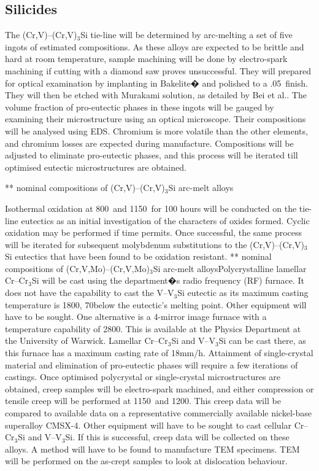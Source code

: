 \subsection{Silicides}

The (Cr,V)--(Cr,V)$_3$Si tie-line will be determined by arc-melting a set of five ingots of estimated compositions. As these alloys are expected to be brittle and hard at room temperature, sample machining will be done by electro-spark machining if cutting with a diamond saw proves unsuccessful. They will prepared for optical examination by implanting in Bakelite� and polished to a .05\micro\meter\ finish. They will then be etched with Murakami solution, as detailed by Bei et al.. The volume fraction of pro-eutectic phases in these ingots will be gauged by examining their microstructure using an optical microscope. Their compositions will be analysed using EDS. Chromium is more volatile than the other elements, and chromium losses are expected during manufacture. Compositions will be adjusted to eliminate pro-eutectic phases, and this process will be iterated till optimised eutectic microstructures are obtained. 

** nominal compositions of (Cr,V)--(Cr,V)$_3$Si arc-melt alloys

Isothermal oxidation at 800\celsius\ and 1150\celsius\ for 100 hours will be conducted on the tie-line eutectics as an initial investigation of the characters of oxides formed. Cyclic oxidation may be performed if time permits. Once successful, the same process will be iterated for subsequent molybdenum substitutions to the (Cr,V)--(Cr,V)$_3$Si eutectics that have been found to be oxidation resistant. 
** nominal compositions of (Cr,V,Mo)--(Cr,V,Mo)$_3$Si arc-melt alloysPolycrystalline lamellar Cr--Cr$_3$Si will be cast using the department�s radio frequency (RF) furnace. It does not have the capability to cast the V--V$_3$Si eutectic as its maximum casting temperature is 1800\celsius, 70\celsius below the eutectic's melting point. Other equipment will have to be sought. One alternative is a 4-mirror image furnace with a temperature capability of 2800\celsius. This is available at the Physics Department at the University of Warwick. Lamellar Cr--Cr$_3$Si and V--V$_3$Si can be cast there, as this furnace has a maximum casting rate of 18mm/h. Attainment of single-crystal material and elimination of pro-eutectic phases will require a few iterations of castings. Once optimised polycrystal or single-crystal microstructures are obtained, creep samples will be electro-spark machined, and either compression or tensile creep will be performed at 1150\celsius\ and 1200\celsius. This creep data will be compared to available data on a representative commercially available nickel-base superalloy CMSX-4. Other equipment will have to be sought to cast cellular Cr--Cr$_3$Si and V--V$_3$Si. If this is successful, creep data will be collected on these alloys. A method will have to be found to manufacture TEM specimens. TEM will be performed on the as-crept samples to look at dislocation behaviour.

